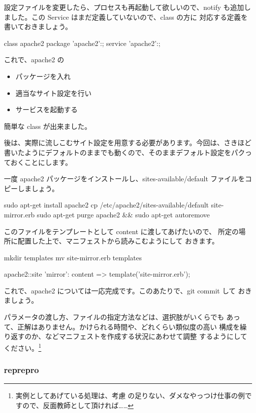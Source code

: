 \documentclass[mingoth,a4paper]{jsarticle}
\begin{document}
設定ファイルを変更したら、プロセスも再起動して欲しいので、notify
も追加しました。この Service はまだ定義していないので、class の方に
対応する定義を書いておきましょう。

\begin{commandline}
class apache2 {
  package { 'apache2':; }
  service { 'apache2':; }
}
\end{commandline}

これで、apache2 の
\begin{itemize}
\item パッケージを入れ
\item 適当なサイト設定を行い
\item サービスを起動する
\end{itemize}
簡単な class が出来ました。

後は、実際に流しこむサイト設定を用意する必要があります。今回は、さきほど
書いたようにデフォルトのままでも動くので、そのままデフォルト設定をパクっ
ておくことにします。

一度 apache2 パッケージをインストールし、sites-available/default
ファイルをコピーしましょう。

\begin{commandline}
sudo apt-get install apache2
cp /etc/apache2/sites-available/default site-mirror.erb
sudo apt-get purge apache2 && sudo apt-get autoremove
\end{commandline}

このファイルをテンプレートとして content に渡してあげたいので、
所定の場所に配置した上で、マニフェストから読みこむようにして
おきます。
\begin{commandline}
mkdir templates
mv site-mirror.erb  templates

apache2::site {
  'mirror':
    content => template('site-mirror.erb');
}
\end{commandline}

これで、apache2 については一応完成です。このあたりで、git commit して
おきましょう。

パラメータの渡し方、ファイルの指定方法などは、選択肢がいくらでも
あって、正解はありません。かけられる時間や、どれくらい類似度の高い
構成を繰り返すのか、などマニフェストを作成する状況にあわせて調整
するようにしてください。\footnote{実例としてあげている処理は、考慮
の足りない、ダメなやっつけ仕事の例ですので、反面教師として頂ければ……}

\subsubsection{reprepro}
\end{document}
